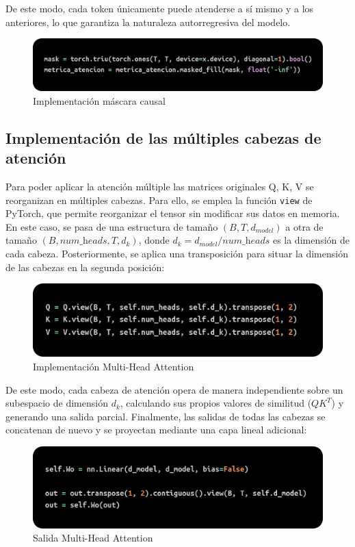 \documentclass[11pt]{book}
\theoremstyle{plain}
\theoremstyle{definition}
\begin{document}
De este modo, cada token únicamente puede atenderse a sí mismo y a los anteriores, lo que garantiza la naturaleza autorregresiva del modelo.

\begin{figure}[h]
    \centering
    \includegraphics[width=0.5\linewidth]{img/masked.png}
    \caption{Implementación máscara causal}
    \label{fig:placeholder10}
\end{figure}

\subsection{Implementación de las múltiples cabezas de atención}
Para poder aplicar la atención múltiple las matrices originales Q, K, V se reorganizan en múltiples cabezas. Para ello, se emplea la función \texttt{view} de PyTorch, que permite reorganizar el tensor sin modificar sus datos en memoria. En este caso, se pasa de una estructura de tamaño $(B, T, d_{model})$ a otra de tamaño $(B, \textit{num\_heads}, T, d_k)$, donde $d_k = d_{model} / \textit{num\_heads}$ es la dimensión de cada cabeza. Posteriormente, se aplica una transposición para situar la dimensión de las cabezas en la segunda posición:

\begin{figure}[h]
    \centering
    \includegraphics[width=0.5\linewidth]{img/heads.png}
    \caption{Implementación Multi-Head Attention}
    \label{fig:placeholder11}
\end{figure}

De este modo, cada cabeza de atención opera de manera independiente sobre un subespacio de dimensión $d_k$, calculando sus propios valores de similitud ($QK^T$) y generando una salida parcial. Finalmente, las salidas de todas las cabezas se concatenan de nuevo y se proyectan mediante una capa lineal adicional:

\begin{figure}[h]
    \centering
    \includegraphics[width=0.5\linewidth]{img/heads2.png}
    \caption{Salida Multi-Head Attention}
    \label{fig:placeholder12}
\end{figure}
\end{document}

